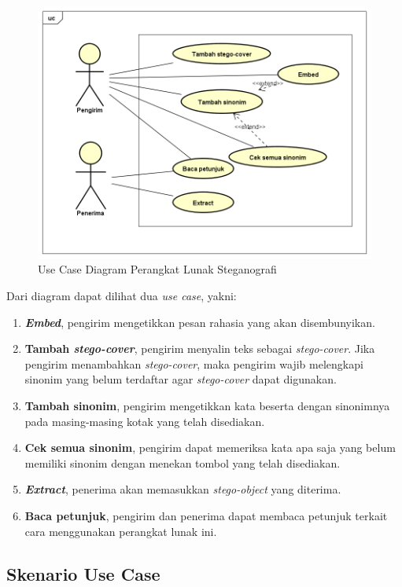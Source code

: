 \begin{figure}[H]
	\centering
	\includegraphics[scale=0.5]{Gambar/usecase}
	\caption{Use Case Diagram Perangkat Lunak Steganografi} 
	\label{fig:3_usecase}
\end{figure}

Dari diagram dapat dilihat dua \textit{use case}, yakni:
\begin{enumerate}
	\item \textbf{\textit{Embed}}, pengirim mengetikkan pesan rahasia yang akan disembunyikan.
	\item \textbf{Tambah \textit{stego-cover}}, pengirim menyalin teks sebagai \textit{stego-cover}. Jika pengirim menambahkan \textit{stego-cover}, maka pengirim wajib melengkapi sinonim yang belum terdaftar agar \textit{stego-cover} dapat digunakan.
	\item \textbf{Tambah sinonim}, pengirim mengetikkan kata beserta dengan sinonimnya pada masing-masing kotak yang telah disediakan.
	\item \textbf{Cek semua sinonim}, pengirim dapat memeriksa kata apa saja yang belum memiliki sinonim dengan menekan tombol yang telah disediakan.
	\item \textbf{\textit{Extract}}, penerima akan memasukkan \textit{stego-object} yang diterima.
	\item \textbf{Baca petunjuk}, pengirim dan penerima dapat membaca petunjuk terkait cara menggunakan perangkat lunak ini.
\end{enumerate}

\subsection{Skenario Use Case}

